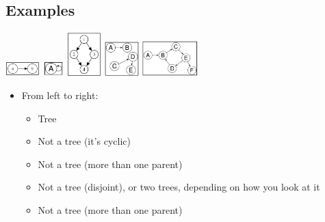 \documentclass[10pt]{article}
\begin{document}
\subsection*{Examples}
\begin{center}
    \includegraphics[width = 0.1\textwidth]{images/img00001}
    \includegraphics[width = 0.06\textwidth]{images/img00002}
    \includegraphics[width = 0.1\textwidth]{images/img00003}
    \includegraphics[width = 0.1\textwidth]{images/img00004}
    \includegraphics[width = 0.16\textwidth]{images/img00005}
\end{center}
\begin{itemize}
    \item From left to right:
    \begin{itemize}
        \item Tree
        \item Not a tree (it's cyclic)
        \item Not a tree (more than one parent)
        \item Not a tree (disjoint), or two trees, depending on how you look at it
        \item Not a tree (more than one parent)
    \end{itemize}
\end{itemize}
\end{document}
